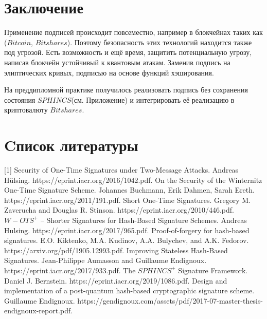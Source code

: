 \documentclass[a4paper, 14pt]{extarticle}
\begin{document}
\newpage

\section{Заключение}
Применение подписей происходит повсеместно, например в блокчейнах таких как ($Bitcoin$, $Bitshares$). Поэтому безопасность этих технологий находится также под угрозой. Есть возможность и ещё время, защитить потенциальную угрозу, написав блокчейн устойчивый к квантовым атакам. Заменив подпись на элиптических кривых, подписью на основе функций хэширования.

На преддипломной практике получилось реализовать подпись без сохранения состояния $SPHINCS$(см. Приложение) и интегрировать её реализацию в криптовалюту $Bitshares$. 
\newpage

\section{Cписок литературы}
[1] Security of One-Time Signatures under Two-Message Attacks. Andreas Hülsing. https://eprint.iacr.org/2016/1042.pdf.
\newline
\newline
[2] On the Security of the Winternitz One-Time Signature Scheme. Johannes Buchmann, Erik Dahmen, Sarah Ereth. https://eprint.iacr.org/2011/191.pdf.
\newline
\newline
[3] Short One-Time Signatures. Gregory M. Zaverucha and Douglas R. Stinson. https://eprint.iacr.org/2010/446.pdf.
\newline
\newline
[4] $W-OTS^{+}$ – Shorter Signatures for Hash-Based Signature Schemes. Andreas Hulsing. https://eprint.iacr.org/2017/965.pdf.
\newline
\newline
[5] Proof-of-forgery for hash-based signatures. E.O. Kiktenko, M.A. Kudinov, A.A. Bulychev, and A.K. Fedorov. https://arxiv.org/pdf/1905.12993.pdf.
\newline
\newline
[6] Improving Stateless Hash-Based Signatures. Jean-Philippe Aumasson and Guillaume Endignoux. https://eprint.iacr.org/2017/933.pdf.
\newline
\newline
[7] The $SPHINCS^{+}$ Signature Framework. Daniel J. Bernstein. https://eprint.iacr.org/2019/1086.pdf.
\newline
\newline
[8] Design and implementation of a post-quantum
hash-based cryptographic signature scheme. Guillaume Endignoux. https://gendignoux.com/assets/pdf/2017-07-master-thesis-endignoux-report.pdf.
\newpage
\end{document}
